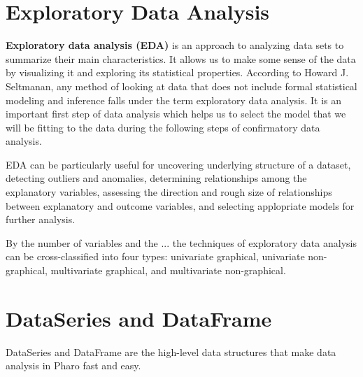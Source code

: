 \documentclass{article}
\begin{document}
\begin{multicols}{2}

%
%
%
%

\section{Exploratory Data Analysis}
\label{sec:eda}
\textbf{Exploratory data analysis (EDA)} is an approach to analyzing data sets to summarize their main characteristics. It allows us to make some sense of the data by visualizing it and exploring its statistical properties. According to Howard J. Seltmanan, any method of looking at data that does not include formal statistical modeling and inference falls under the term exploratory data analysis\cite{Seltman}. It is an important first step of data analysis which helps us to select the model that we will be fitting to the data during the following steps of confirmatory data analysis.

EDA can be particularly useful for uncovering underlying structure of a dataset, detecting outliers and anomalies, determining relationships among the explanatory variables, assessing the direction and rough size of relationships between explanatory and outcome variables, and selecting applopriate models for further analysis\cite{eStats}.

By the number of variables and the ... the techniques of exploratory data analysis can be cross-classified into four types: univariate graphical, univariate non-graphical, multivariate graphical, and multivariate non-graphical.

\section{DataSeries and DataFrame}
\label{sec:dataframe}
DataSeries and DataFrame are the high-level data structures that make data analysis in Pharo fast and easy.
\cite{McKinney}


\end{multicols}
\end{document}
